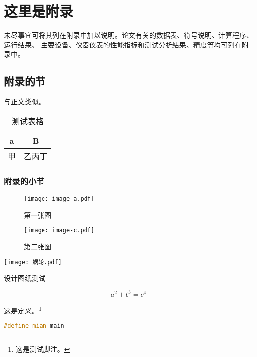 \chapter{这里是附录}\label{app:1}
未尽事宜可将其列在附录中加以说明。论文有关的数据表、符号说明、计算程序、运行结果、
主要设备、仪器仪表的性能指标和测试分析结果、精度等均可列在附录中。
\section{附录的节}
与正文类似。
\begin{table}[ht]
	\centering
	\caption{测试表格}\label{tab:mytable}
	\begin{tabular}{cc}
		\toprule
		a & B   \\
		\midrule
		甲   & 乙丙丁 \\
		\bottomrule
	\end{tabular}
\end{table}

\subsection{附录的小节}
\zhlipsum[1][name = zhufu]

\begin{figure}[ht]
	\centering
	\begin{minipage}{0.4\textwidth}
		\centering
		\texttt{[image: image-a.pdf]}
		\caption{第一张图}\label{fig:test1}
	\end{minipage}
	\hspace{1cm}
	\begin{minipage}{0.4\textwidth}
		\centering
		\texttt{[image: image-c.pdf]}
		\caption{第二张图}\label{fig:test2}
	\end{minipage}
\end{figure}

\zhlipsum[name = xiangyu]

\begin{dfigure}[tbp]
	\centering\texttt{[image: 蜗轮.pdf]}
	\caption{设计图纸测试}
\end{dfigure}

\zhlipsum[1][name = aspirin]

\begin{equation}
	a^2+b^3=c^4
\end{equation}

\begin{definition}
	这是定义。\footnote{这是测试脚注。}
\end{definition}

\begin{lstlisting}[language=c++,caption=一个测试,label=mycode]
#define mian main
	\end{lstlisting}

